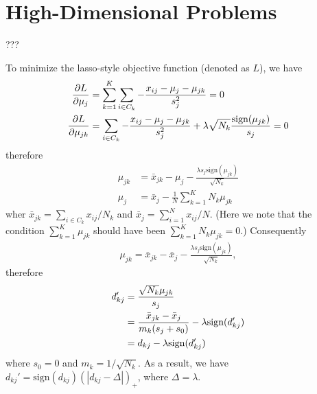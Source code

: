 \chapter{High-Dimensional Problems}
\label{ch:18}

\begin{exercise}
  ???
\end{exercise}

\begin{exercise}
  To minimize the lasso-style objective function (denoted as $L$), we have
  \begin{subequations}
    \begin{align}
      \pdv{L}{\mu_j} & = \sum_{k=1}^K\sum_{i\in C_k}-\frac{x_{ij}- \mu_j -
      \mu_{jk}} {s_j^2} = 0 \\
      \pdv{L}{\mu_{jk}} & = \sum_{i\in C_k} -\frac{x_{ij}- \mu_j - \mu_{jk}}
      {s_j^2} + \lambda\sqrt{N_k}\frac{\mbox{sign}(\mu_{jk})}{s_j} = 0
    \end{align}
  \end{subequations}
  therefore
  \begin{subequations}
    \begin{align}
      \mu_{jk} & = \bar{x}_{jk} - \mu_j -
      \frac{\lambda s_j \mbox{sign}(\mu_{jk})}{\sqrt{N_k}} \\
      \mu_j &= \bar{x}_j - \frac{1}{N}\sum_{k=1}^KN_k\mu_{jk}
    \end{align}
  \end{subequations}
  wher $\bar{x}_{jk} = \sum_{i\in C_k}x_{ij} / N_k$ and $\bar{x}_j =
  \sum_{i=1}^Nx_{ij} / N$. (Here we note that the condition
  $\sum_{k=1}^K\mu_{jk}$ should have been $\sum_{k=1}^KN_k\mu_{jk} = 0$.)
  Consequently
  \begin{align}
    \mu_{jk} = \bar{x}_{jk}- \bar{x}_j - \frac{\lambda s_j
    \mbox{sign}(\mu_{jk})}{\sqrt{N_k}},
  \end{align}
  therefore
  \begin{align}
    d_{kj}' &= \frac{\sqrt{N_k}\mu_{jk}}{s_j} \notag \\
    &= \frac{\bar{x}_{jk}- \bar{x}_j}{m_k(s_j + s_0)} -
    \lambda\mbox{sign}(d_{kj}') \notag \\
    &= d_{kj} - \lambda\mbox{sign}(d_{kj}')
  \end{align}
  where $s_0 = 0$ and $m_k = 1 /\sqrt{N_k}$. As a result, we have $d_{kj}' =
  \mbox{sign}(d_{kj})(|d_{kj} - \Delta|)_+$, where $\Delta = \lambda$.
\end{exercise}

